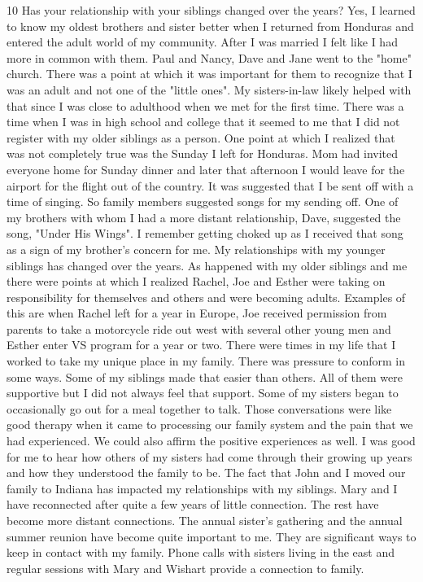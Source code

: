 10 Has your relationship with your siblings changed over the years?
Yes, I learned to know my oldest brothers and sister better when I returned from Honduras and entered the adult world of my community. After I was married I felt like I had more in common with them. Paul and Nancy, Dave and Jane went to the "home" church. There was a point at which it was important for them to recognize that I was an adult and not one of the "little ones".  My sisters-in-law likely helped with that since I was close to adulthood when we met for the first time.
There was a time when I was in high school and college that it seemed to me that I did not register with my older siblings as a person. One point at which I realized that was not completely true was the Sunday I left for Honduras. Mom had invited everyone home for Sunday dinner and later that afternoon I would leave for the airport for the flight out of the country. It was suggested that I be sent off with a time of singing. So family members suggested songs for my sending off. One of my brothers with whom I had a more distant relationship, Dave, suggested the song, "Under His Wings". I remember getting choked up as I received that song as a sign of my brother's concern for me.
My relationships with my younger siblings has changed over the years. As happened with my older siblings and me there were points at which I realized Rachel, Joe and Esther were taking on responsibility for themselves and others and were becoming adults. Examples of this are when Rachel left for a year in Europe, Joe received permission from parents to take a motorcycle ride out west with several other young men and Esther enter VS program for a year or two.
There were times in my life that I worked to take my unique place in my family. There was pressure to conform in some ways. Some of my siblings made that easier than others. All of them were supportive but I did not always feel that support. Some of my sisters began to occasionally go out for a meal together to talk. Those conversations were like good therapy when it came to processing our family system and the pain that we had experienced. We could also affirm the positive experiences as well. I was good for me to hear how others of my sisters had come through their growing up years and how they understood the family to be.
The fact that John and I moved our family to Indiana has impacted my relationships with my siblings. Mary and I have reconnected after quite a few years of little connection. The rest have become more distant connections. The annual sister's gathering and the annual summer reunion have become quite important to me. They are significant ways to keep in contact with my family. Phone calls with sisters living in the east and regular sessions with Mary and Wishart provide a connection to family.





